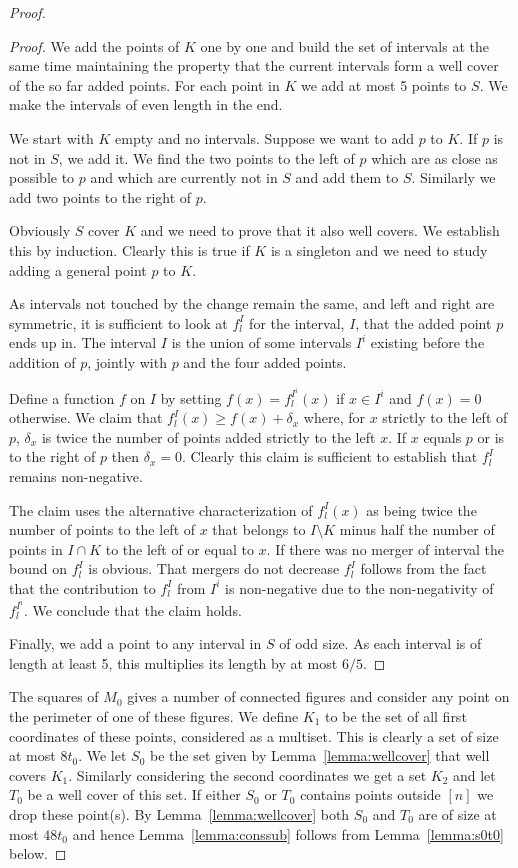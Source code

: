 \documentclass{theoretics}
\begin{document}
\begin{proof}
\begin{proof}
We add the points of $K$ one by one and build the set of
intervals at the same time maintaining the
property that the current intervals form a well cover of the
so far added points.  For each point in $K$ we add
at most 5 points to $S$.  We make the intervals of even length
in the end.  

We start with $K$ empty and no intervals.
Suppose we want to add $p$ to $K$.
If $p$ is not in $S$, we add it.  We find the
two points to the left of $p$ which are as close as
possible to $p$ and which are currently not in $S$ and add
them to $S$.  Similarly we add two points to the right of $p$.

Obviously $S$ cover $K$ and we need to prove that it also
well covers.  We establish
this by induction.  Clearly this is true if $K$ is a
singleton and we need to study adding a general point $p$ to $K$.

As intervals not touched by the change remain the same,
and left and right are symmetric, it is sufficient to look
at $f^I_l$ for the interval, $I$, that the added point $p$
ends up in.  The interval $I$ is the union of some
intervals $I^i$ existing before the addition of $p$,
jointly with $p$ and the four added points.

Define a function $f$ on $I$ by setting $f(x)=f_{l}^{I^i}(x)$
if $x\in I^i$ and $f(x)=0$ otherwise.  We claim
that $f_l^I(x) \geq f(x)+\delta_x$ where, for $x$ strictly
to the left of $p$, $\delta_x$ is twice
the number of points added strictly to the left $x$.
If $x$ equals $p$ or is to the right of $p$ then $\delta_x = 0$.
Clearly this claim is sufficient to establish that $f_l^I$ remains non-negative.

The claim uses the alternative characterization of $f^I_l(x)$ as being
twice the number of points to the left of $x$ that belongs to  $I\setminus K$
minus half the number of points in $I \cap K$ to the left of or
equal to $x$.
If there was no merger of interval the bound on $f_l^I$ is obvious.
That mergers do not decrease $f_l^I$ follows from
the fact that the contribution to $f_l^I$ from $I^i$ is non-negative
due to the non-negativity of $f_l^{I^i}$.  We conclude that the
claim holds.

Finally, we add a point to any interval in $S$ of odd
size.  As each interval is of length at least 5,
this multiplies its length by at most $6/5$.
\end{proof}

The squares of $M_0$ gives a number of connected figures
and consider any point on the perimeter of one of these
figures.  We define $K_1$ to be
the set of all first coordinates of these points, considered
as a multiset.  This is clearly a set of size at
most $8t_0$.   We let $S_0$ be the
set given by Lemma~\ref{lemma:wellcover} that well
covers $K_1$.  Similarly considering the second
coordinates we get a set $K_2$ and let $T_0$ be a well cover
of this set.   If either $S_0$ or $T_0$ contains points
outside $[n]$ we drop these point(s).  
By Lemma~\ref{lemma:wellcover} both $S_0$ and $T_0$ are
of size at most $48t_0$ and hence Lemma~\ref{lemma:conssub}
follows from Lemma~\ref{lemma:s0t0} below.
\end{proof}
\end{document}
